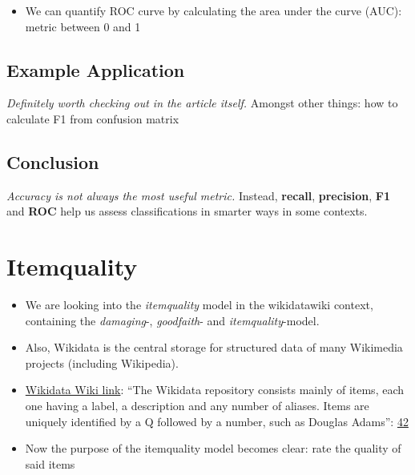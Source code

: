 \documentclass[12pt,a4paper]{article}
\begin{document}
\begin{itemize}
\begin{itemize}
\item We can quantify ROC curve by calculating the area under the curve (AUC): metric between 0 and 1
\end{itemize}
\end{itemize}
\subsection{Example Application}
\textit{Definitely worth checking out in the article itself.} Amongst other things: how to calculate F1 from confusion matrix
\subsection{Conclusion}
\textit{Accuracy is not always the most useful metric.} Instead, \textbf{recall}, \textbf{precision}, \textbf{F1} and \textbf{ROC} help us assess classifications in smarter ways in some contexts.
\section{Itemquality}
\begin{itemize}
\item We are looking into the \textit{itemquality} model in the wikidatawiki context, containing the \textit{damaging}-, \textit{goodfaith}- and \textit{itemquality}-model. 
\item Also, Wikidata is the central storage for structured data of many Wikimedia projects (including Wikipedia).
\item \href{https://www.wikidata.org/wiki/Wikidata:Introduction}{Wikidata Wiki link}: ``The Wikidata repository consists mainly of items, each one having a label, a description and any number of aliases. Items are uniquely identified by a Q followed by a number, such as Douglas Adams'': \href{https://www.wikidata.org/wiki/Q42}{42}
\item Now the purpose of the itemquality model becomes clear: rate the quality of said items
\end{itemize}
%
%
\end{document}
